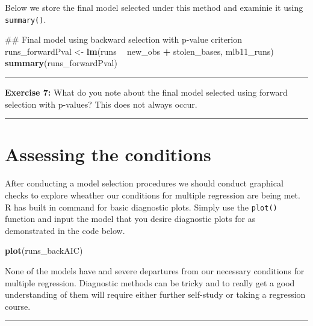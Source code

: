 \documentclass[]{book}
\newenvironment{Shaded}{\begin{snugshade}}{\end{snugshade}}
\newcommand{\KeywordTok}[1]{\textcolor[rgb]{0.13,0.29,0.53}{\textbf{#1}}}
\newcommand{\NormalTok}[1]{#1}
\newcommand{\OperatorTok}[1]{\textcolor[rgb]{0.81,0.36,0.00}{\textbf{#1}}}
\newcommand{\StringTok}[1]{\textcolor[rgb]{0.31,0.60,0.02}{#1}}
\theoremstyle{definition}
\theoremstyle{definition}
\theoremstyle{definition}
\theoremstyle{remark}
\begin{document}
Below we store the final model selected under this method and examinie
it using \texttt{summary()}.

\begin{Shaded}
\begin{Highlighting}[]
\NormalTok{## Final model using backward selection with p-value criterion}
\NormalTok{runs_forwardPval <-}\StringTok{ }\KeywordTok{lm}\NormalTok{(runs }\OperatorTok{~}\StringTok{ }\NormalTok{new_obs }\OperatorTok{+}\StringTok{ }\NormalTok{stolen_bases, mlb11_runs)}
\KeywordTok{summary}\NormalTok{(runs_forwardPval)}
\end{Highlighting}
\end{Shaded}

\begin{center}\rule{0.5\linewidth}{\linethickness}\end{center}

\textbf{Exercise 7:} What do you note about the final model selected
using forward selection with p-values? This does not always occur.

\begin{center}\rule{0.5\linewidth}{\linethickness}\end{center}

\hypertarget{assessing-the-conditions}{%
\section{Assessing the conditions}\label{assessing-the-conditions}}

After conducting a model selection procedures we should conduct
graphical checks to explore wheather our conditions for multiple
regression are being met. R has built in command for basic diagnostic
plots. Simply use the \texttt{plot()} function and input the model that
you desire diagnostic plots for as demonstrated in the code below.

\begin{Shaded}
\begin{Highlighting}[]
\KeywordTok{plot}\NormalTok{(runs_backAIC)}
\end{Highlighting}
\end{Shaded}

None of the models have and severe departures from our necessary
conditions for multiple regression. Diagnostic methods can be tricky and
to really get a good understanding of them will require either further
self-study or taking a regression course.

\begin{center}\rule{0.5\linewidth}{\linethickness}\end{center}
\end{document}
